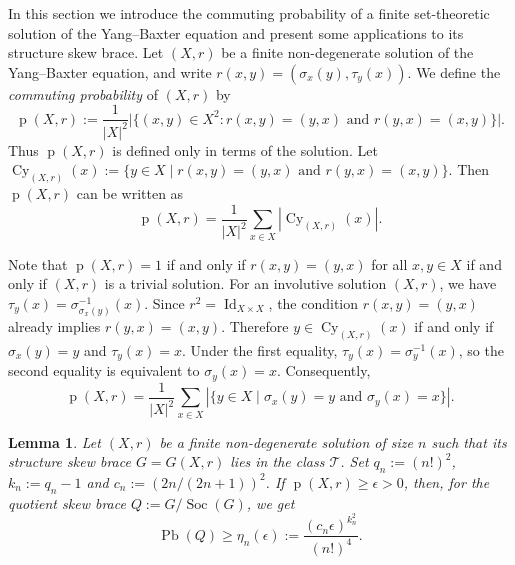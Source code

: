 \documentclass[10pt,a4paper]{amsart}
\numberwithin{equation}{section}
\newtheorem{lem}[equation]{Lemma}
\newcommand{\Cy}{\operatorname{Cy} }
\newcommand{\Pb}{\operatorname{Pb} }
\newcommand{\Id}{\operatorname{Id}}
\newcommand{\Soc}{\operatorname{Soc} }
\begin{document}
In this section we introduce the commuting probability of a finite set-theoretic solution of the Yang--Baxter equation and present some applications  to its structure skew brace. Let $(X,r)$ be a finite non-degenerate solution of the Yang--Baxter equation, and write
$r(x,y)=(\sigma_x(y),\tau_y(x))$.  We define the
\emph{commuting probability} of $(X,r)$ by
$$\operatorname{p}(X,r) :=\frac{1}{|X|^2}
\big|\{(x,y)\in X^2:r(x,y)=(y,x)\text{ and }r(y,x)=(x,y)\}\big|.
$$
Thus $\operatorname{p}(X,r)$ is defined only in terms of the solution. Let $\Cy_{(X,r)}(x) :=\{y\in X\mid r(x,y)=(y,x)\text{ and }r(y,x)=(x,y)\}$. Then $\operatorname{p}(X,r)$ can be written as 
$$\operatorname{p}(X,r) =\frac{1}{|X|^2}\sum_{x\in X}|\Cy_{(X,r)}(x)|.
$$

Note that $\operatorname{p}(X,r)=1$ if and only if $r(x,y)=(y,x)$ for all $x,y\in X$ if and only if $(X, r)$ is a trivial solution. 
For an involutive solution $(X,r)$, we have
$\tau_y(x)=\sigma^{-1}_{\sigma_x(y)}(x)$. Since $r^2=\Id_{X\times X}$, the condition
$r(x,y)=(y,x)$ already implies $r(y,x)=(x,y)$. Therefore
$y\in\Cy_{(X,r)}(x)$ if and only if
$\sigma_x(y)=y$ and $\tau_y(x)=x$. Under the first equality,
$\tau_y(x)=\sigma_y^{-1}(x)$, so the second equality is equivalent to
$\sigma_y(x)=x$. Consequently,
$$
\operatorname{p}(X,r)=\frac{1}{|X|^2}\sum_{x\in X}
|\{y\in X\mid \sigma_x(y)=y\text{ and }\sigma_y(x)=x\}|.
$$



\begin{lem}\label{lem:ybe-rn2-local-global}
Let $(X,r)$ be a finite non-degenerate solution of size $n$ such that its structure skew brace $G=G(X,r)$ lies in the class $\mathcal{T}$. Set
$q_n := (n!)^2$, $k_n := q_n-1$ and $c_n := (2n/(2n+1))^2$. If
$\operatorname{p}(X,r)\geqslant\epsilon>0$, then, for the quotient skew brace $Q := G/\Soc(G)$, we get
$$
\Pb(Q)\geqslant\eta_n(\epsilon):=
\frac{(c_n\epsilon)^{k_n^2}}{(n!)^4}.
$$
\end{lem}
\end{document}

